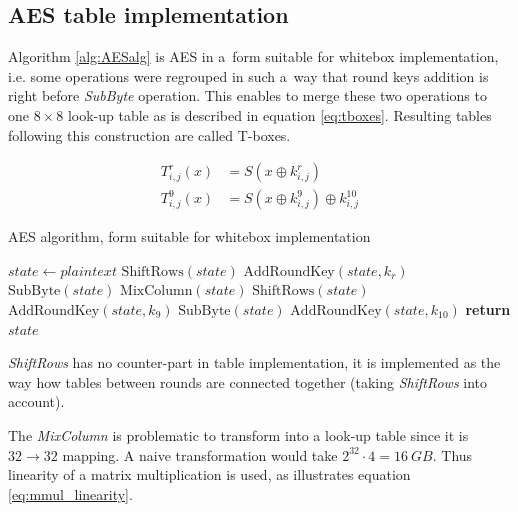 \documentclass[11pt,oneside,final]{fithesis2}
\begin{document}
    \subsection{AES table implementation}\label{sec:aes_table}
    Algorithm \ref{alg:AESalg} is AES in a~form suitable for whitebox implementation, i.e. some operations were regrouped in such a~way that round keys addition 
    is right before \emph{SubByte} operation. This enables to merge these two operations to one $8\times8$ look-up table as is described in equation \ref{eq:tboxes}.
    Resulting tables following this construction are called T-boxes.
    
    \begin{subequations} \label{eq:tboxes}
    \begin{align}
	T^r_{i,j}(x)    &= S\left(x \oplus k^r_{i,j}\right)\\
	T^{9}_{i,j}(x)  &= S\left(x \oplus k^{9}_{i,j}\right) \oplus k^{10}_{i,j}
    \end{align}
    \end{subequations}

    \begin{algorithm}
        \caption{AES algorithm, form suitable for whitebox implementation}
	\begin{algorithmic}[1]
	      
	    \State $state \gets plaintext$          
		\State $\text{ShiftRows}(state)$
		\State $\text{AddRoundKey}(state, k_{r})$
		\State $\text{SubByte}(state)$
		\State $\text{MixColumn}(state)$
	    \EndFor
	    \State $\text{ShiftRows}(state)$
	    \State $\text{AddRoundKey}(state, k_{9})$
	    \State $\text{SubByte}(state)$
	    \State $\text{AddRoundKey}(state, k_{10})$
	    \State \textbf{return} $state$
	    \EndFunction
	\end{algorithmic}
	\label{alg:AESalg}
    \end{algorithm}

    \emph{ShiftRows} has no counter-part in
    table implementation, it is implemented as the way how tables between rounds are connected together (taking \emph{ShiftRows} into account). 
    
    The \emph{MixColumn} is problematic to transform into a look-up table
    since it is $32 \rightarrow 32$ mapping. A naive transformation would take $2^{32}\cdot4 = 16~GB$. Thus linearity of a matrix multiplication is used, as
    illustrates equation \ref{eq:mmul_linearity}. 
    
\end{document}
